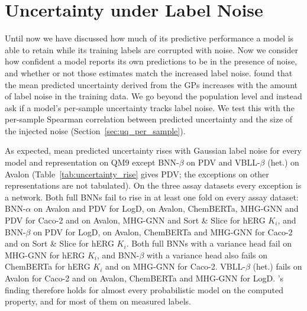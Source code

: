 \section{Uncertainty under Label Noise}\label{sec:uq}

Until now we have discussed how much of its predictive performance a model is able to retain while its training labels are corrupted with noise. Now we consider how confident a model reports its own predictions to be in the presence of noise, and whether or not those estimates match the increased label noise. \citet{Kolmar2021} found that the mean predicted uncertainty derived from the GPs increases with the amount of label noise in the training data. We go beyond the population level and instead ask if a model's per-sample uncertainty tracks label noise. We test this with the per-sample Spearman correlation between predicted uncertainty and the size of the injected noise (Section~\ref{sec:uq_per_sample}).

As expected, mean predicted uncertainty rises with Gaussian label noise for every model and representation on QM9 except BNN-$\beta$ on PDV and VBLL-$\beta$ (het.) on Avalon (Table~\ref{tab:uncertainty_rise} gives PDV; the exceptions on other representations are not tabulated). On the three assay datasets every exception is a network. Both full BNNs fail to rise in at least one fold on every assay dataset: BNN-$\alpha$ on Avalon and PDV for LogD, on Avalon, ChemBERTa, MHG-GNN and PDV for Caco-2 and on Avalon, MHG-GNN and Sort \& Slice for hERG $K_i$, and BNN-$\beta$ on PDV for LogD, on Avalon, ChemBERTa and MHG-GNN for Caco-2 and on Sort \& Slice for hERG $K_i$. Both full BNNs with a variance head fail on MHG-GNN for hERG $K_i$, and BNN-$\beta$ with a variance head also fails on ChemBERTa for hERG $K_i$ and on MHG-GNN for Caco-2. VBLL-$\beta$ (het.) fails on Avalon for Caco-2 and on Avalon, ChemBERTa and MHG-GNN for LogD. \citet{Kolmar2021}'s finding therefore holds for almost every probabilistic model on the computed property, and for most of them on measured labels.

